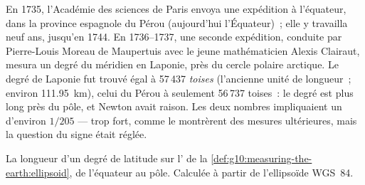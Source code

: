 \begin{history}
En 1735, l'Académie des sciences de Paris envoya une expédition à
l'équateur, dans la province espagnole du Pérou (aujourd'hui l'Équateur)~;
elle y travailla neuf ans, jusqu'en 1744. En 1736--1737, une seconde
expédition, conduite par Pierre-Louis Moreau de Maupertuis avec le jeune
mathématicien Alexis Clairaut, mesura un degré du méridien en Laponie, près
du cercle polaire arctique. Le degré de Laponie fut trouvé égal à
57\,437 \emph{toises} (l'ancienne unité de longueur~; environ
\qty{111.95}{km}), celui du Pérou à seulement 56\,737 toises~: le degré est
plus long près du pôle, et Newton avait raison. Les deux nombres
impliquaient un  d'environ $1/205$ --- trop fort, comme le
montrèrent des mesures ultérieures, mais la question du signe était réglée.
\end{history}

\begin{omfigure}

{\small La longueur d'un degré de latitude sur l' de
la \cref{def:g10:measuring-the-earth:ellipsoid}, de l'équateur au pôle.
Calculée à partir de l'ellipsoïde WGS~84.}
\end{omfigure}


